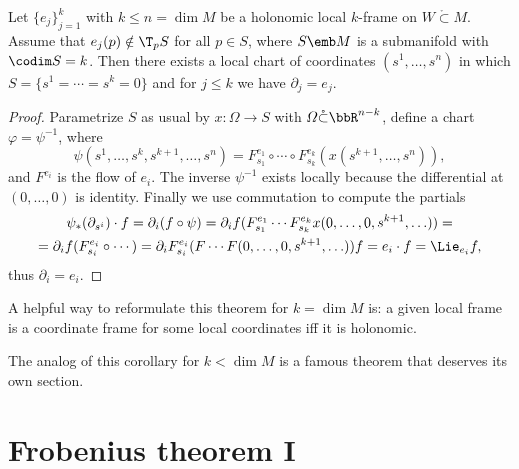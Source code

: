 \begin{thm}\label{thm rectification}
    Let $\{e_j\}_{j=1}^k$ with $k\leq n=\dim M$ be a holonomic local $k$-frame on $W\mathring{\subset}M$. Assume that $e_j(p)\notin \T_p S$ for all $p\in S$, where $S\emb M$ is a submanifold with $\codim S=k$. Then there exists a local chart of coordinates $(s^1,\ldots,s^n)$ in which $S=\{s^1=\cdots=s^k=0\}$ and for $j\leq k$ we have $\partial_j=e_j$.
\end{thm}
\begin{proof}
    Parametrize $S$ as usual by $x:\varOmega\to S$ with $\varOmega\mathring{\subset}\bbR^{n-k}$, define a chart $\varphi=\psi^{-1}$, where
    \[\psi(s^1,\ldots,s^k,s^{k+1},\ldots,s^n)=F^{e_1}_{s_1}\circ\cdots\circ F^{e_k}_{s_k}(x(s^{k+1},\ldots,s^n)),\]
    and $F^{e_i}$ is the flow of $e_i$. The inverse $\psi^{-1}$ exists locally because the differential at $(0,\ldots,0)$ is identity. Finally we use commutation to compute the partials
    \begin{multline}
        \psi_\ast (\partial_{s^i})\cdot f=\partial_i(f\circ\psi)=\partial_i f(F^{e_1}_{s_1}\cdots F^{e_k}_{s_k} x(0,\ldots,0,s^{k+1},\ldots))=\\=\partial_i f(F^{e_i}_{s_i}\circ\cdots )=\partial_i F^{e_i}_{s_i}(F\cdots F(0,\ldots,0,s^{k+1},\ldots))f=e_i\cdot f=\Lie_{e_i}f,
    \end{multline}
    thus $\partial_i=e_i$.
\end{proof}

\begin{cor}
    A helpful way to reformulate this theorem for $k=\dim M$ is: a given local frame is a coordinate frame for some local coordinates iff it is holonomic.
\end{cor}

The analog of this corollary for $k<\dim M$ is a famous theorem that deserves its own section.





\section{Frobenius theorem I}\label{sec: frobenius i}

